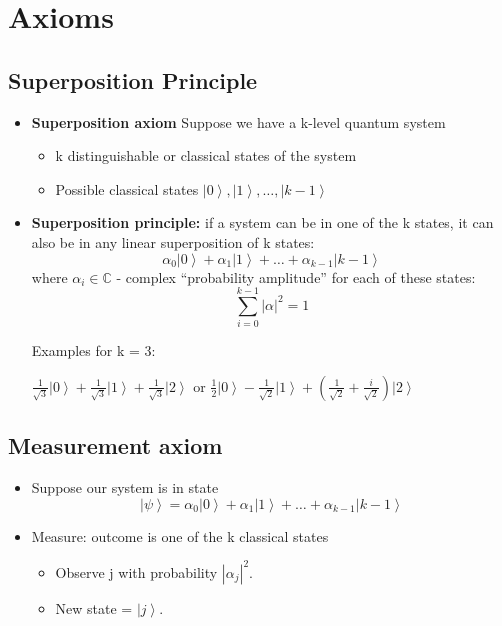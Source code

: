 \documentclass{scrartcl}
\newcommand{\cplx}{\mathbb{C}} %
\newcommand{\ket}[1]{\left| #1 \right>} %
\begin{document}
\section{Axioms}
\label{sec:2, week 1}

\subsection {Superposition Principle}
\label{sec:2-1}

\begin{itemize}
\item{\bf Superposition axiom} Suppose we have a k-level quantum system
  \begin{itemize}
  \item k distinguishable or classical states of the system
  \item Possible classical states $\ket{0},\ket{1}, \dots , \ket{k-1}$
  \end{itemize}
\item {\bf Superposition principle:} if a system can be in one of the k states,
  it can also be in any linear superposition of k states: \[\alpha_0 \ket{0} +
  \alpha_1 \ket{1} + \dots + \alpha_{k-1} \ket{k-1} \] where $\alpha_i \in
  \cplx$ - complex ``probability amplitude'' for each of these
  states: \[\sum \limits_{i=0}^{k-1} |\alpha|^2=1\]

  Examples for k = 3:

  $\frac 1{\sqrt{3}} \ket0 + \frac1{\sqrt{3}} \ket1 + \frac1{\sqrt{3}}\ket2$ or
  $\frac1{2}\ket0 - \frac1 {\sqrt{2}}\ket1 + (\frac1{\sqrt{2}} +
  \frac{i}{\sqrt{2}}) \ket2$
\end{itemize}

\subsection{Measurement axiom}
\begin{itemize}
\item Suppose our system is in state $$\ket\psi = \alpha_0\ket0 + \alpha_1\ket1
  + \ldots + \alpha_{k-1} \ket{k-1} $$
\item Measure: outcome is one of the k classical states
  \begin{itemize}
  \item Observe j with probability $|\alpha_j|^2$.
  \item New state = $\ket j$.
  \end{itemize}
\end{itemize}
\end{document}
